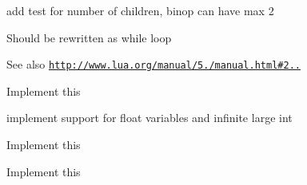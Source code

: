 
\begin{DoxyRefList}
\item[\label{todo__todo000001}%
\hypertarget{todo__todo000001}{}%
Class \hyperlink{classBinop}{Binop} ]add test for number of children, binop can have max 2  
\item[\label{todo__todo000003}%
\hypertarget{todo__todo000003}{}%
Member \hyperlink{classLoop_af57e9c094063c514758dfe7bd986d6e7a7637227f2d51adc47dea05b5fe6802ac}{Loop\+:\+:For} ]Should be rewritten as while loop \begin{DoxySeeAlso}{See also}
\href{http://www.lua.org/manual/5.1/manual.html#2.4.5}{\tt http\+://www.\+lua.\+org/manual/5./manual.\+html\#2..}  
\end{DoxySeeAlso}

\item[\label{todo__todo000002}%
\hypertarget{todo__todo000002}{}%
Member \hyperlink{classLoop_af57e9c094063c514758dfe7bd986d6e7a681be1f5a1ab60d13010c6df3358088e}{Loop\+:\+:While} ]Implement this  
\item[\label{todo__todo000004}%
\hypertarget{todo__todo000004}{}%
Class \hyperlink{classMemory}{Memory} ]implement support for float variables and infinite large int  
\item[\label{todo__todo000015}%
\hypertarget{todo__todo000015}{}%
Member \hyperlink{classNode_a8dad370be1595f49e0a7c2406a91e867a0636a6d172da086b233f0170ba995a81}{Node\+:\+:Do} ]Implement this 

Implement this 


\end{DoxyRefList}
